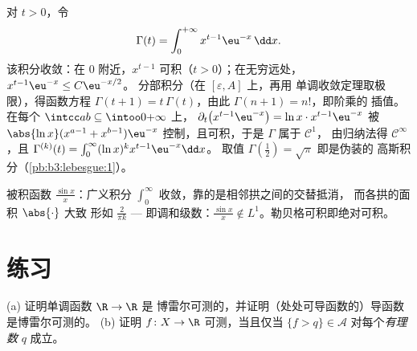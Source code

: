 \begin{example}[伽马函数]\label{ex:b3:lebesgue:gamma}
对 $t > 0$，令
\[
\Gamma(t) = \int_0^{+\infty} x^{t-1}\eu^{-x}\,\dd x .
\]
该积分收敛：在 $0$ 附近，$x^{t-1}$ 可积（$t >
0$）；在无穷远处，$x^{t-1}\eu^{-x} \leq C\eu^{-x/2}$。
分部积分（在 $[\varepsilon, A]$ 上，再用
单调收敛定理取极限），得函数方程 $\Gamma(t + 1) =
t\,\Gamma(t)$，由此 $\Gamma(n+1) = n!$，即阶乘的
插值。在每个 $\intcc ab \subseteq \intoo0{+\infty}$ 上，
$\partial_t\bigl(x^{t-1}\eu^{-x}\bigr) = \ln
x\cdot x^{t-1}\eu^{-x}$ 被 $\abs{\ln x}(x^{a-1} +
x^{b-1})\eu^{-x}$ 控制，且可积，于是 $\Gamma$ 属于 $\mathcal C^1$，
由归纳法得 $\mathcal C^\infty$，且 $\Gamma^{(k)}(t) =
\int_0^\infty(\ln x)^kx^{t-1}\eu^{-x}\dd x$。
取值 $\Gamma(\frac12) = \sqrt\pi$ 即是伪装的
高斯积分（\cref{pb:b3:lebesgue:1}）。
\end{example}

\begin{omfigure}

{\small 被积函数 $\frac{\sin x}x$：广义积分
$\int_0^\infty$ 收敛，靠的是相邻拱之间的交替抵消，
而各拱的面积 $\abs{\cdot}$ 大致
形如 $\frac2{\pi k}$ --- 即调和级数：$\frac{\sin x}x
\notin L^1$。勒贝格可积即绝对可积。}
\end{omfigure}

\section{练习}

\begin{exercise}[$\star$]\label{exo:b3:lebesgue:1}
(a) 证明单调函数 $\R \to \R$ 是
博雷尔可测的，并证明（处处可导函数的）导函数
是博雷尔可测的。
(b) 证明 $f \colon X \to \R$ 可测，当且仅当 $\{f > q\}
\in \mathcal A$ 对每个\emph{有理数} $q$ 成立。
\end{exercise}

